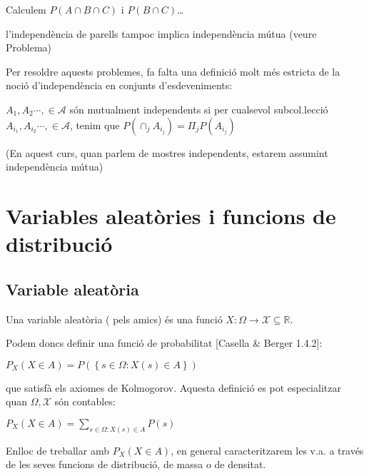 \documentclass[letterpaper,10pt,english]{sphinxmanual}
\let\sphinxpxdimen\pdfpxdimen\else\newdimen\sphinxpxdimen
\begin{document}
\begin{figure}[htbp]
\centering

\noindent\sphinxincludegraphics[height=300\sphinxpxdimen]{{ex_independencia}.png}
\end{figure}

Calculem \(P\left(A \cap B \cap C\right)\) i \(P\left(B \cap C\right)\)…

 l’independència de parells tampoc implica independència mútua (veure Problema)

Per resoldre aquests problemes, fa falta una definició molt més estricta
de la noció d’independència en conjunts d’esdeveniments:

 \(A_1, A_2 \cdots, \in \mathcal{A}\) són mutualment independents si per cualsevol
subcol.lecció \(A_{i_1}, A_{i_2} \cdots, \in \mathcal{A}\), tenim que \(P\left(\cap_j A_{i_j}\right) = \Pi_j P\left(A_{i_j}\right)\)

(En aquest curs, quan parlem de mostres independents, estarem assumint independència mútua)


\section{Variables aleatòries i funcions de distribució}
\label{\detokenize{0_Intro/0_1_Repas_probabilitat:variables-aleatories-i-funcions-de-distribucio}}

\subsection{Variable aleatòria}
\label{\detokenize{0_Intro/0_1_Repas_probabilitat:variable-aleatoria}}
 Una variable aleatòria ( pels amics) és una funció \(X : \Omega \to \mathcal{X} \subseteq \mathbb{R}\).

Podem doncs definir una funció de probabilitat {[}Casella \& Berger 1.4.2{]}:

\(P_X\left(X \in A\right) = P\left(\left\{s\in \Omega: X\left(s\right) \in A \right\}\right)\)

que satisfà els axiomes de Kolmogorov. Aquesta definició es pot especialitzar
quan \(\Omega, \mathcal{X}\) són contables:

\(P_X\left(X \in A\right) = \sum_{s\in \Omega: X\left(s\right) \in A } P\left(s\right)\)

Enlloc de treballar amb \(P_X\left(X \in A\right)\), en general caracteritzarem les v.a. a través de les seves funcions de distribució, de massa o de densitat.
\end{document}
